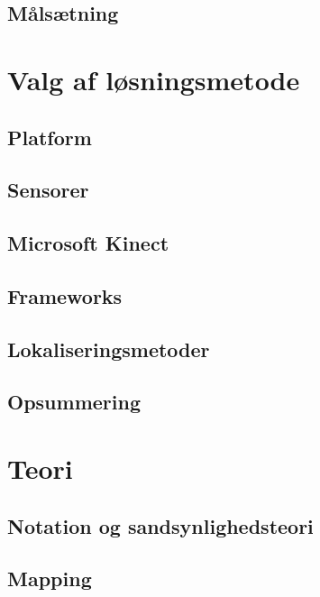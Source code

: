 \chapter*{Målsætning}

\clearpage

\part{Valg af løsningsmetode}


\chapter{Platform}

\chapter{Sensorer}

\chapter{Microsoft Kinect}

\chapter{Frameworks}



\chapter{Lokaliseringsmetoder}

\chapter{Opsummering}


\part{Teori}
\chapter{Notation og sandsynlighedsteori}

\chapter{Mapping}


